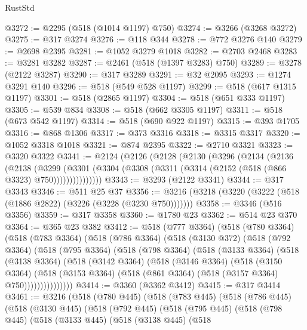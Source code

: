 \begin{lexlean}{RustStd}
\begin{coremodule}
{\begin{coremodule}
{{{{{{{{{{{{{{{{{{{{{{{{{{{{{{{{{{{{{{{{{{{{{{{{{{@3272 := @2295 (@518 (@1014 @1197) @750)
@3274 := @3266 (@3268 @3272)
@3275 := @317 @3274
@3276 := @118 @344
@3278 := @772 @3276 @140
@3279 := @2698 @2395
@3281 := @1052 @3279 @1018
@3282 := @2703 @2468
@3283 := @3281 @3282
@3287 := @2461 (@518 (@1397 @3283) @750)
@3289 := @3278 (@2122 @3287)
@3290 := @317 @3289
@3291 := @32 @2095
@3293 := @1274 @3291 @140
@3296 := @518 (@549 @528 @1197)
@3299 := @518 (@617 @1315 @1197)
@3301 := @518 (@2865 @1197)
@3304 := @518 (@651 @333 @1197)
@3305 := @539 @834
@3308 := @518 (@662 @3305 @1197)
@3311 := @518 (@673 @542 @1197)
@3314 := @518 (@690 @922 @1197)
@3315 := @393 @1705
@3316 := @868 @1306
@3317 := @373 @3316
@3318 := @3315 @3317
@3320 := @1052 @3318 @1018
@3321 := @874 @2395
@3322 := @2710 @3321
@3323 := @3320 @3322
@3341 := @2124
    (@2126
      (@2128
        (@2130
          (@3296
            (@2134
              (@2136
                (@2138
                  (@3299
                    (@3301 (@3304 (@3308 (@3311 (@3314 (@2152 (@518 (@866 @3323) @750)))))))))))))))
@3343 := @3293 (@2122 @3341)
@3344 := @317 @3343
@3346 := @511 @25 @37
@3356 := @3216 (@3218 (@3220 (@3222 (@518 (@1886 @2822) (@3226 (@3228 (@3230 @750)))))))
@3358 := @3346 (@516 @3356)
@3359 := @317 @3358
@3360 := @1780 @23
@3362 := @514 @23 @370
@3364 := @365 @23 @382
@3412 := @518
    (@777 @3364)
    (@518
      (@780 @3364)
      (@518
        (@783 @3364)
        (@518
          (@786 @3364)
          (@518
            (@3130 @372)
            (@518
              (@792 @3364)
              (@518
                (@795 @3364)
                (@518
                  (@798 @3364)
                  (@518
                    (@3133 @3364)
                    (@518
                      (@3138 @3364)
                      (@518
                        (@3142 @3364)
                        (@518
                          (@3146 @3364)
                          (@518
                            (@3150 @3364)
                            (@518
                              (@3153 @3364)
                              (@518 (@861 @3364) (@518 (@3157 @3364) @750)))))))))))))))
@3414 := @3360 (@3362 @3412)
@3415 := @317 @3414
@3461 := @3216
    (@518
      (@780 @445)
      (@518
        (@783 @445)
        (@518
          (@786 @445)
          (@518
            (@3130 @445)
            (@518
              (@792 @445)
              (@518
                (@795 @445)
                (@518
                  (@798 @445)
                  (@518
                    (@3133 @445)
                    (@518
                      (@3138 @445)
                      (@518
}}}}}}}}}}}}}}}}}}}}}}}}}}}}}}}}}}}}}}}}}}}}}}}}}}
\end{coremodule}}
\end{coremodule}
\end{lexlean}
